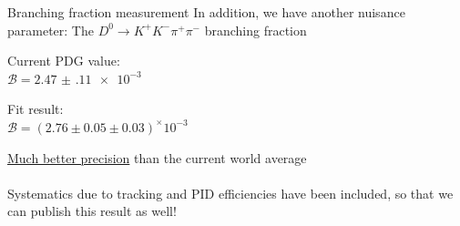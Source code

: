 \documentclass{beamer}
\begin{document}
\begin{frame}{Branching fraction measurement}
  \vspace{0.0cm}
  {\Large In addition, we have another nuisance parameter: The $D^0\to K^+K^-\pi^+\pi^-$ branching fraction\\}
  \begin{center}
    Current PDG value:\\
    $\mathcal{B} = \SI{2.47(11)e-3}{}$
  \end{center}
  \begin{center}
    Fit result:\\
    $\mathcal{B} = (2.76 \pm 0.05 \pm 0.03)^\times 10^{-3}$
  \end{center}
  \underline{Much better precision} than the current world average\\~\\
  Systematics due to tracking and PID efficiencies have been included, so that we can publish this result as well!
\end{frame}
\end{document}
